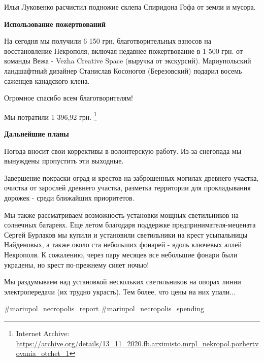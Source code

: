 Илья Луковенко расчистил подножие склепа Спиридона Гофа от земли и мусора. 

\textbf{Использование пожертвований}

На сегодня мы получили 6 150 грн. благотворительных взносов на восстановление
Некрополя, включая недавнее пожертвование в 1 500 грн. от команды Вежа - Vezha
Creative Space (выручка от экскурсий). Мариупольский ландшафтный дизайнер
Станислав Косоногов (Березовский) подарил восемь саженцев канадского клена.

Огромное спасибо всем благотворителям!

Мы потратили 1 396,92 грн.%
\footnote{Internet Archive: \url{https://archive.org/details/13_11_2020.fb.arximisto.mrpl_nekropol.pozhertvovania_otchet_1}}

\textbf{Дальнейшие планы}

Погода вносит свои коррективы в волонтерскую работу. Из-за снегопада мы
вынуждены пропустить эти выходные.

Завершение покраски оград и крестов на заброшенных могилах древнего участка,
очистка от зарослей древнего участка, разметка территории для прокладывания
дорожек - среди ближайших приоритетов.

Мы также рассматриваем возможность установки мощных светильников на солнечных
батареях. Еще летом благодаря поддержке предпринимателя-мецената Сергей
Бурлаков мы купили и установили светильники на крест усыпальницы Найденовых, а
также около ста небольших фонарей - вдоль ключевых аллей Некрополя. К
сожалению, через пару месяцев все небольшие фонари были украдены, но крест
по-прежнему сияет ночью!

Мы раздумываем над установкой нескольких светильников на опорах линии
электропередачи (их трудно украсть). Тем более, что цены на них упали...

\#mariupol\_necropolis\_report
\#mariupol\_necropolis\_spending

